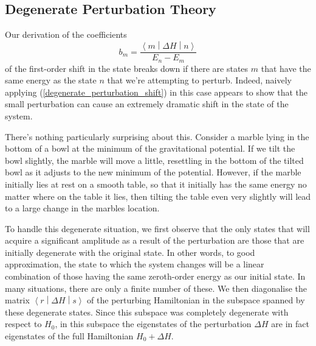 \documentclass{article}
\theoremstyle{plain}\theoremheaderfont{\normalfont\itshape}\theorembodyfont{\rmfamily}\theoremseparator{.}\newtheorem*{rem}{Remark}\newtheorem*{ex}{Example}\newtheorem*{proof}{Proof}\newtheorem*{altp}{Alternative proof}
\theoremstyle{plain}\theoremheaderfont{\normalfont\bfseries}\theorembodyfont{\rmfamily}\theoremseparator{.}\newtheorem{thm}{Theorem}[section]\newtheorem{lem}[thm]{Lemma}\newtheorem{prop}[thm]{Proposition}\newtheorem*{cor}{Corollary}\newtheorem{defn}[thm]{Definition}\newtheorem{clm}[thm]{Claim}\newtheorem{clminproof}{Claim}
\theoremstyle{break}\theoremheaderfont{\normalfont\itshape}\theorembodyfont{\rmfamily}\theoremseparator{.\medskip}\newtheorem*{proofskip}{Proof}\newtheorem*{exs}{Examples}\newtheorem*{rems}{Remarks}
\theoremstyle{break}\theoremheaderfont{\normalfont\bfseries}\theorembodyfont{\rmfamily}\theoremseparator{.\medskip}\newtheorem{lemskip}[thm]{Lemma}\newtheorem{defnskip}[thm]{Definition}\newtheorem{propskip}[thm]{Proposition}\newtheorem{thmskip}[thm]{Theorem}
\numberwithin{equation}{section}
\newcommand{\mel}[3]{\left\langle #1 \middle| #2 \middle| #3 \right\rangle}
\begin{document}
    \subsection{Degenerate Perturbation Theory}\label{Chap:Degenerate_PT}
    Our derivation of the coefficients
    \begin{equation}\label{degenerate_perturbation_shift}
        b_m=\frac{\mel{m}{\Delta H}{n}}{E_n-E_m}
    \end{equation}
    of the first-order shift in the state breaks down if there are states \(m\) that have the same energy as the state \(n\) that we're attempting to perturb. Indeed, naively applying (\ref{degenerate_perturbation_shift}) in this case appears to show that the small perturbation can cause an extremely dramatic shift in the state of the system.
 
    There's nothing particularly surprising about this. Consider a marble lying in the bottom of a bowl at the minimum of the gravitational potential. If we tilt the bowl slightly, the marble will move a little, resettling in the bottom of the tilted bowl as it adjusts to the new minimum of the potential. However, if the marble initially lies at rest on a smooth table, so that it initially has the same energy no matter where on the table it lies, then tilting the table even very slightly will lead to a large change in the marbles location.

    To handle this degenerate situation, we first observe that the only states that will acquire a significant amplitude as a result of the perturbation are those that are initially degenerate with the original state. In other words, to good approximation, the state to which the system changes will be a linear combination of those having the same zeroth-order energy as our initial state. In many situations, there are only a finite number of these. We then diagonalise the matrix \(\mel{r}{\Delta H}{s}\) of the perturbing Hamiltonian in the subspace spanned by these degenerate states. Since this subspace was completely degenerate with respect to \(H_0\), in this subspace the eigenstates of the perturbation \(\Delta H\) are in fact eigenstates of the full Hamiltonian \(H_0+\Delta H\).
\end{document}
